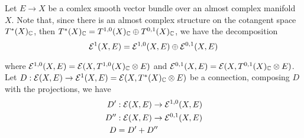 \begin{remark}
	Let $E \to X$ be a comlex smooth vector bundle over an almost complex manifold $X$. Note that, since there is an almost complex structure on the cotangent space $T^*(X)_{\mathbb{C}}$, then $T^*(X)_{\mathbb{C}} = T^{1,0}(X)_{\mathbb{C}} \oplus T^{0,1}(X)_{\mathbb{C}}$, we have the decomposition
	$$
		\mathcal{E}^1(X, E) = \mathcal{E}^{1,0}(X, E) \oplus \mathcal{E}^{0,1}(X, E)
	$$
	
	where $ \mathcal{E}^{1,0}(X, E) =  \mathcal{E}(X, T^{1,0}(X)_{\mathbb{C}} \otimes E)$ and $ \mathcal{E}^{0,1}(X, E) =  \mathcal{E}(X, T^{0,1}(X)_{\mathbb{C}} \otimes E)$. Let $D: \mathcal{E}(X, E) \to \mathcal{E}^1(X, E) = \mathcal{E}(X, T^*(X)_{\mathbb{C}} \otimes E)$ be a connection, composing $D$ with the projections, we have
	\begin{align*}
		D' &: \mathcal{E}(X, E) \to \mathcal{E}^{1,0}(X, E) \\
		D'' &: \mathcal{E}(X, E) \to \mathcal{E}^{0,1}(X, E) \\
		D &= D' + D''
	\end{align*}
\end{remark}

